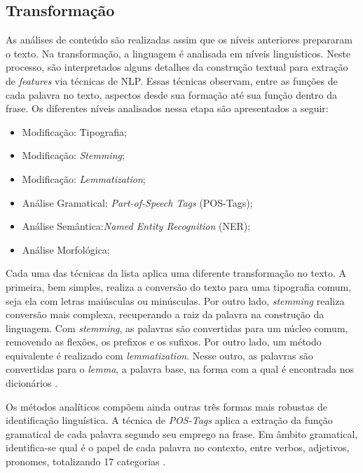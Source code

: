 \subsection{Transformação}
\label{subsec-transformacao}

As análises de conteúdo são realizadas assim que os níveis anteriores prepararam o texto. Na transformação, a linguagem é analisada em níveis linguísticos. Neste processo, são interpretados alguns detalhes da construção textual para extração de \textit{features} via técnicas de NLP. Essas técnicas observam, entre as funções de cada palavra no texto, aspectos desde sua formação até sua função dentro da frase. Os diferentes níveis analisados nessa etapa são apresentados a seguir:

\begin{itemize}
	\item Modificação: Tipografia;
	\item Modificação: \textit{Stemming};
	\item Modificação: \textit{Lemmatization};
	\item Análise Gramatical: \textit{Part-of-Speech Tags} (POS-Tags);
	\item Análise Semântica:\textit{Named Entity Recognition} (NER);
	\item Análise Morfológica;
\end{itemize}

Cada uma das técnicas da lista aplica uma diferente transformação no texto. A primeira, bem simples, realiza a conversão do texto para uma tipografia comum, seja ela com letras maiúsculas ou minúsculas. Por outro lado, \textit{stemming} realiza conversão mais complexa, recuperando a raiz da palavra na construção da linguagem. Com \textit{stemming}, as palavras são convertidas para um núcleo comum, removendo as flexões, os prefixos e os sufixos. Por outro lado, um método equivalente é realizado com \textit{lemmatization}. Nesse outro, as palavras são convertidas para o \textit{lemma}, a palavra base, na forma com a qual é encontrada nos dicionários \cite{baeza2011}. 

Os métodos analíticos compõem ainda outras três formas mais robustas de identificação linguística. A técnica de \textit{POS-Tags} aplica a extração da função gramatical de cada palavra segundo seu emprego na frase. Em âmbito gramatical, identifica-se qual é o papel de cada palavra no contexto, entre verbos, adjetivos, pronomes, totalizando 17 categorias \cite{marneffe2021}.

